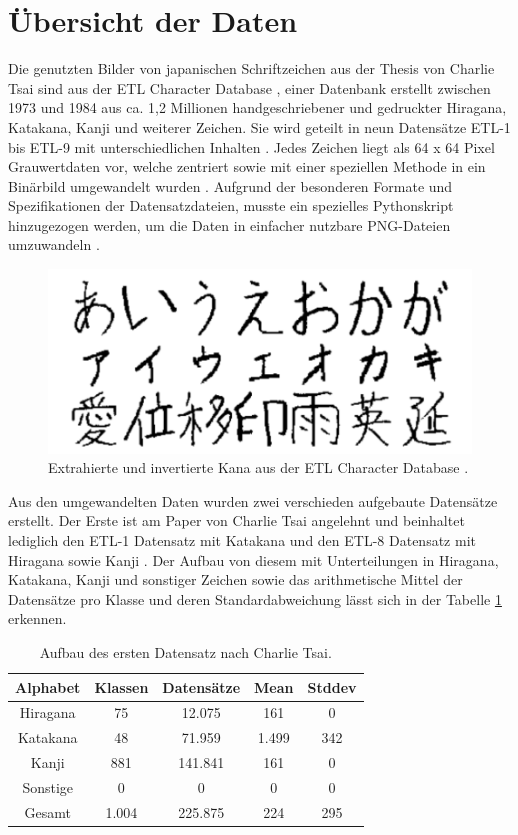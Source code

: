 \documentclass[twoside,a4paper]{IEEEtran}
\begin{document}
\section{Übersicht der Daten} %
Die genutzten Bilder von japanischen Schriftzeichen aus der Thesis von Charlie Tsai sind aus der ETL Character Database \cite[S.2-3]{RHC}, einer Datenbank erstellt zwischen 1973 und 1984 aus ca. 1,2 Millionen handgeschriebener und gedruckter Hiragana, Katakana, Kanji und weiterer Zeichen. Sie wird geteilt in neun Datensätze ETL-1 bis ETL-9 mit unterschiedlichen Inhalten \cite{ETL}. Jedes Zeichen liegt als 64 x 64 Pixel Grauwertdaten vor, welche zentriert sowie mit einer speziellen Methode in ein Binärbild umgewandelt wurden \cite[S.3]{RHC}. Aufgrund der besonderen Formate und Spezifikationen der Datensatzdateien, musste ein spezielles Pythonskript hinzugezogen werden, um die Daten in einfacher nutzbare PNG-Dateien umzuwandeln \cite{ETL_FORMATS}. 

\begin{figure}[!htb]
	\includegraphics[width=\columnwidth]{kana}
	\caption{Extrahierte und invertierte Kana aus der ETL Character Database \cite[S.1]{RHC}.}
	\label{kana}
\end{figure}

Aus den umgewandelten Daten wurden zwei verschieden aufgebaute Datensätze erstellt. Der Erste ist am Paper von Charlie Tsai angelehnt und beinhaltet lediglich den ETL-1 Datensatz mit Katakana und den ETL-8 Datensatz mit Hiragana sowie Kanji \cite[S.3]{RHC}. Der Aufbau von diesem mit Unterteilungen in Hiragana, Katakana, Kanji und sonstiger Zeichen sowie das arithmetische Mittel der Datensätze pro Klasse und deren Standardabweichung lässt sich in der Tabelle \ref{data_tsai} erkennen.
\begin{table}[!htb]
	\caption{Aufbau des ersten Datensatz nach Charlie Tsai.}
	\label{data_tsai}
	\centering
	\begin{tabular}{|c|c|c|c|c|}
		\hline
		Alphabet & Klassen & Datensätze & Mean & Stddev\\
		\hline
		\hline
		Hiragana & 75 & 12.075 & 161 & 0\\
		\hline 
		Katakana & 48 & 71.959 & 1.499 & 342\\
		\hline
		Kanji & 881 & 141.841 & 161 & 0\\
		\hline
		Sonstige & 0 & 0 & 0 & 0\\
		\hline
		\hline
		Gesamt & 1.004 & 225.875 & 224 & 295\\
		\hline
	\end{tabular}
\end{table}
\end{document}
